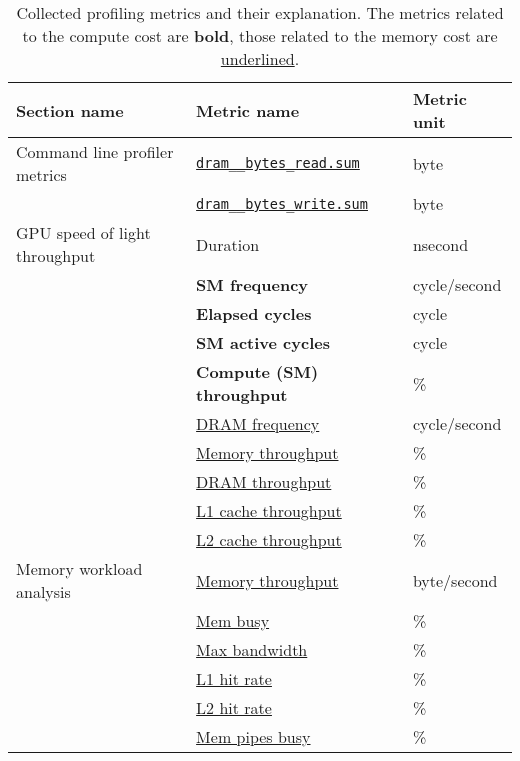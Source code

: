 \begin{table}[t]
  \begin{tabular}{lll}
    \toprule
    Section name                  & Metric name                                   & Metric unit  \\
    \midrule\midrule
    Command line profiler metrics & \underline{\texttt{dram\_\_bytes\_read.sum}}  & byte         \\
                                  & \underline{\texttt{dram\_\_bytes\_write.sum}} & byte         \\
    GPU speed of light throughput & Duration                                      & nsecond      \\
                                  & \textbf{SM frequency}                         & cycle/second \\
                                  & \textbf{Elapsed cycles}                       & cycle        \\
                                  & \textbf{SM active cycles}                     & cycle        \\
                                  & \textbf{Compute (SM) throughput}              & \%           \\
                                  & \underline{DRAM frequency}                    & cycle/second \\
                                  & \underline{Memory throughput}                 & \%           \\
                                  & \underline{DRAM throughput}                   & \%           \\
                                  & \underline{L1 cache throughput}               & \%           \\
                                  & \underline{L2 cache throughput}               & \%           \\
    Memory workload analysis      & \underline{Memory throughput}                 & byte/second  \\
                                  & \underline{Mem busy}                          & \%           \\
                                  & \underline{Max bandwidth}                     & \%           \\
                                  & \underline{L1 hit rate}                       & \%           \\
                                  & \underline{L2 hit rate}                       & \%           \\
                                  & \underline{Mem pipes busy}                    & \%           \\
    \bottomrule
  \end{tabular}
  \caption[Collected profiling metrics and their explanation]{Collected profiling metrics and their explanation. The metrics related to the compute cost are \textbf{bold}, those related to the memory cost are \underline{underlined}.}
  \label{tab:4-profiling-metrics}
\end{table}

